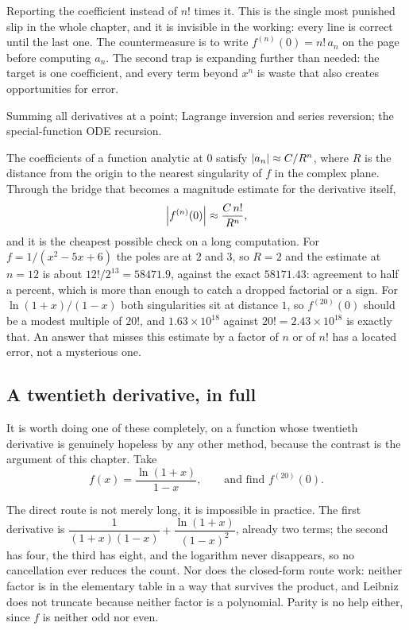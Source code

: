 \begin{trap}
Reporting the coefficient instead of $n!$ times it. This is the single most punished slip in the whole chapter, and it is invisible in the working: every line is correct until the last one. The countermeasure is to write $f^{(n)}(0)=n!\,a_{n}$ on the page before computing $a_{n}$. The second trap is expanding further than needed: the target is one coefficient, and every term beyond $x^{n}$ is waste that also creates opportunities for error.
\end{trap}

\begin{seealsob}Summing all derivatives at a point; Lagrange inversion and series reversion; the special-function ODE recursion.\end{seealsob}

\begin{keynote}
The coefficients of a function analytic at $0$ satisfy $\left\lvert a_{n}\right\rvert\approx C/R^{n}$, where $R$ is the distance from the origin to the nearest singularity of $f$ in the complex plane. Through the bridge that becomes a magnitude estimate for the derivative itself,
\[
\left\lvert f^{(n)}(0)\right\rvert\approx \frac{C\,n!}{R^{n}} ,
\]
and it is the cheapest possible check on a long computation. For $f=1/(x^{2}-5x+6)$ the poles are at $2$ and $3$, so $R=2$ and the estimate at $n=12$ is about $12!/2^{13}=58471.9$, against the exact $58171.43$: agreement to half a percent, which is more than enough to catch a dropped factorial or a sign. For $\ln(1+x)/(1-x)$ both singularities sit at distance $1$, so $f^{(20)}(0)$ should be a modest multiple of $20!$, and $1.63\times10^{18}$ against $20!=2.43\times10^{18}$ is exactly that. An answer that misses this estimate by a factor of $n$ or of $n!$ has a located error, not a mysterious one.
\end{keynote}

\subsection{A twentieth derivative, in full}

It is worth doing one of these completely, on a function whose twentieth derivative is genuinely hopeless by any other method, because the contrast is the argument of this chapter. Take
\[
f(x)=\frac{\ln(1+x)}{1-x},\qquad\text{and find } f^{(20)}(0).
\]

The direct route is not merely long, it is impossible in practice. The first derivative is $\dfrac{1}{(1+x)(1-x)}+\dfrac{\ln(1+x)}{(1-x)^{2}}$, already two terms; the second has four, the third has eight, and the logarithm never disappears, so no cancellation ever reduces the count. Nor does the closed-form route work: neither factor is in the elementary table in a way that survives the product, and Leibniz does not truncate because neither factor is a polynomial. Parity is no help either, since $f$ is neither odd nor even.

